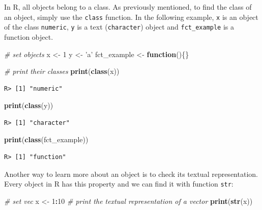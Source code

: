 \documentclass[
  12pt,
]{book}
\newenvironment{Shaded}{\begin{snugshade}}{\end{snugshade}}
\newcommand{\CommentTok}[1]{\textcolor[rgb]{0.37,0.37,0.37}{\textit{#1}}}
\newcommand{\ControlFlowTok}[1]{\textcolor[rgb]{0.27,0.27,0.27}{\textbf{#1}}}
\newcommand{\DecValTok}[1]{\textcolor[rgb]{0.06,0.06,0.06}{#1}}
\newcommand{\KeywordTok}[1]{\textcolor[rgb]{0.27,0.27,0.27}{\textbf{#1}}}
\newcommand{\NormalTok}[1]{#1}
\newcommand{\OperatorTok}[1]{\textcolor[rgb]{0.43,0.43,0.43}{\textbf{#1}}}
\newcommand{\StringTok}[1]{\textcolor[rgb]{0.5,0.5,0.5}{#1}}
\begin{document}
In R, all objects belong to a class. As previously mentioned, to find the class of an object, simply use the \texttt{class} function. In the following example, \texttt{x} is an object of the class \texttt{numeric}, \texttt{y} is a text (\texttt{character}) object and \texttt{fct\_example} is a function object. 

\begin{Shaded}
\begin{Highlighting}[]
\CommentTok{# set objects}
\NormalTok{x <-}\StringTok{ }\DecValTok{1}
\NormalTok{y <-}\StringTok{ 'a'}
\NormalTok{fct_example <-}\StringTok{ }\ControlFlowTok{function}\NormalTok{()\{\}}

\CommentTok{# print their classes}
\KeywordTok{print}\NormalTok{(}\KeywordTok{class}\NormalTok{(x))}
\end{Highlighting}
\end{Shaded}

\begin{verbatim}
R> [1] "numeric"
\end{verbatim}

\begin{Shaded}
\begin{Highlighting}[]
\KeywordTok{print}\NormalTok{(}\KeywordTok{class}\NormalTok{(y))}
\end{Highlighting}
\end{Shaded}

\begin{verbatim}
R> [1] "character"
\end{verbatim}

\begin{Shaded}
\begin{Highlighting}[]
\KeywordTok{print}\NormalTok{(}\KeywordTok{class}\NormalTok{(fct_example))}
\end{Highlighting}
\end{Shaded}

\begin{verbatim}
R> [1] "function"
\end{verbatim}

Another way to learn more about an object is to check its textual representation. Every object in R has this property and we can find it with function \texttt{str}: 

\begin{Shaded}
\begin{Highlighting}[]
\CommentTok{# set vec}
\NormalTok{x <-}\StringTok{ }\DecValTok{1}\OperatorTok{:}\DecValTok{10}
\CommentTok{# print the textual representation of a vector}
\KeywordTok{print}\NormalTok{(}\KeywordTok{str}\NormalTok{(x))}
\end{Highlighting}
\end{Shaded}
\end{document}
